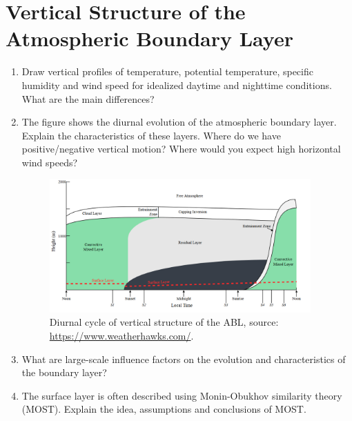 \documentclass{article}
\begin{document}
\section{Vertical Structure of the Atmospheric Boundary Layer}
\begin{enumerate}[label=(\alph*)]
    \item Draw vertical profiles of temperature, potential temperature, specific humidity and wind speed for idealized daytime and nighttime conditions. What are the main differences? %
    \item The figure shows the diurnal evolution of the atmospheric boundary layer. Explain the characteristics of these layers. Where do we have positive/negative vertical motion? Where would you expect high horizontal wind speeds? %
    \begin{figure}[H]
        \centering
        \includegraphics[width=10cm]{figures/PBL2.png}
        \caption{Diurnal cycle of vertical structure of the ABL, source: \url{https://www.weatherhawks.com/}.}
        \label{fig:pbl-diurnal}
    \end{figure}
    \item What are large-scale influence factors on the evolution and characteristics of the boundary layer? %
    \item The surface layer is often described using Monin-Obukhov similarity theory (MOST). Explain the idea, assumptions and conclusions of MOST. %
\end{enumerate}
\end{document}
